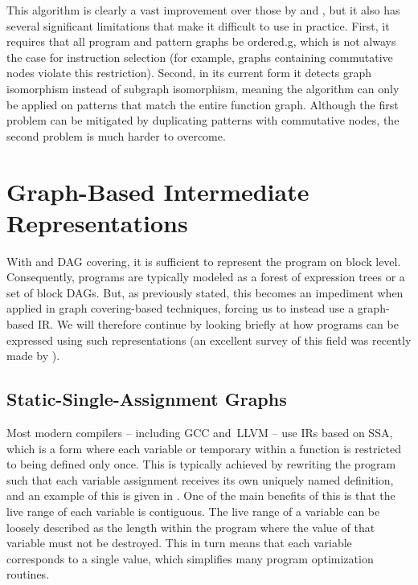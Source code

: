 This algorithm is clearly a vast improvement over those by
\citeauthor{Ullmann1976} and \citeauthor{Cordella2001}, but it also has several
significant limitations that make it difficult to use in practice.
%
First, it
requires that all \gls{program} and \glspl{pattern graph} be \gls{ordered.g},
which is not always the case for \gls{instruction selection} (for example,
\glspl{graph} containing commutative \glspl{node} violate this
restriction).
%
Second, in its current form it detects \gls{graph isomorphism}
instead of \gls{subgraph isomorphism}, meaning the algorithm can only be applied
on \glspl{pattern} that match the entire \gls{function graph}.
%
Although the first
problem can be mitigated by duplicating \glspl{pattern} with commutative
\glspl{node}, the second problem is much harder to overcome.


\section{Graph-Based Intermediate Representations}

With  and \gls{DAG covering}, it is sufficient to
represent the \gls{program} on \gls{block} level.
%
Consequently, \glspl{program}
are typically modeled as a \gls{forest} of \glspl{expression tree} or a set of
\glspl{block DAG}.
%
But, as previously stated, this becomes an impediment when
applied in \gls{graph covering}-based techniques, forcing us to instead use a
\gls{graph}-based \glsdesc{IR}.
%
We will therefore continue by looking briefly at
how \glspl{program} can be expressed using such representations (an excellent
survey of this field was recently made by \textcite{Stanier2013}).


\subsection{Static-Single-Assignment Graphs}

Most modern \glspl{compiler} -- including \gls{GCC} and~\gls{LLVM} -- use
\glspl{IR} based on \gls{SSA}, which is a form where each variable or
\gls{temporary} within a \gls{function} is restricted to being defined only
once.
%
This is typically achieved by rewriting the \gls{program} such that each
variable assignment receives its own uniquely named definition, and an example
of this is given in .
%
One of the main benefits of this is
that the \gls{live range} of each variable is contiguous.
%
The \gls{live range}
of a variable can be loosely described as the length within the \gls{program}
where the value of that variable must not be destroyed.
%
This in turn means that each variable corresponds to a single value, which
simplifies many \gls{program} optimization routines.

